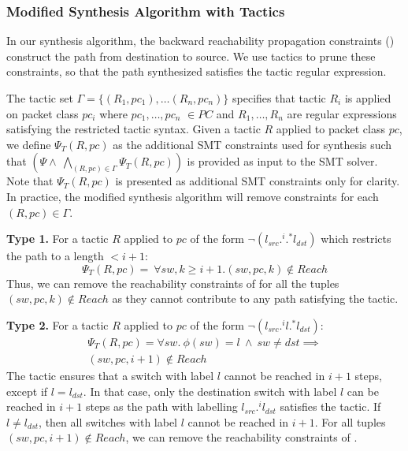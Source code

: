 \subsubsection{Modified Synthesis Algorithm with Tactics}
In our synthesis algorithm, the backward reachability propagation constraints () 
construct the path from destination to source. We use tactics to prune these constraints, so that
the path synthesized satisfies the tactic regular expression.  

The tactic set $\Gamma = \{(R_1, pc_1), \ldots (R_n, pc_n)\}$
specifies that tactic $R_i$ is applied on packet class $pc_i$ where 
$pc_1, \ldots, pc_n$ $\in PC$ and $R_1,\ldots,R_n$ are regular
expressions satisfying the restricted tactic syntax. 
Given a tactic $R$ applied to packet class $pc$, 
we define $\Psi_T(R,pc)$ as the additional SMT constraints used for 
synthesis such that  $(\Psi \wedge\ \bigwedge\limits_{(R, pc) \in \Gamma} \Psi_T(R,pc))$ 
is provided as input to the SMT solver.
	Note that $\Psi_T(R,pc)$ is presented as additional SMT 
constraints only for clarity. 
In practice, the modified synthesis algorithm will remove constraints for each 
$(R,pc)\in \Gamma$.

\noindent\textbf{Type 1.} For a tactic $R$ applied to $pc$ of the form $\neg (l_{src} .^i .^* l_{dst})$ which restricts the path to a length $ < i + 1$:
\begin{equation}
	\Psi_T(R, pc) = ~ \forall sw,k \geq i + 1. (sw,pc,k) \notin Reach
\end{equation}
Thus, we can remove the reachability constraints  of  
for all the tuples $(sw,pc,k) \notin Reach$
as they cannot contribute to any path satisfying the tactic.  

\noindent\textbf{Type 2.} For a tactic $R$ applied to $pc$ 
of the form $\neg (l_{src}  .^i l .^* l_{dst})$:
\begin{multline} \label{eq:t1}
\Psi_T(R,pc) = \forall sw.~ \phi(sw) = l ~\wedge~ sw \not= dst \implies \\ 
(sw, pc, i + 1) \notin Reach
\end{multline}
The tactic ensures that a switch with label $l$ cannot be reached in $i+1$
steps, except if $l = l_{dst}$. In that case,
only the destination switch with label $l$ can be reached in $i+1$ steps as 
the path with labelling $l_{src}.^i l_{dst}$ satisfies the tactic. If $l \not= l_{dst}$, then
all switches with label $l$ cannot be reached in $i+1$. For all tuples
$(sw, pc, i+1) \notin Reach$, we can remove the reachability constraints of .


